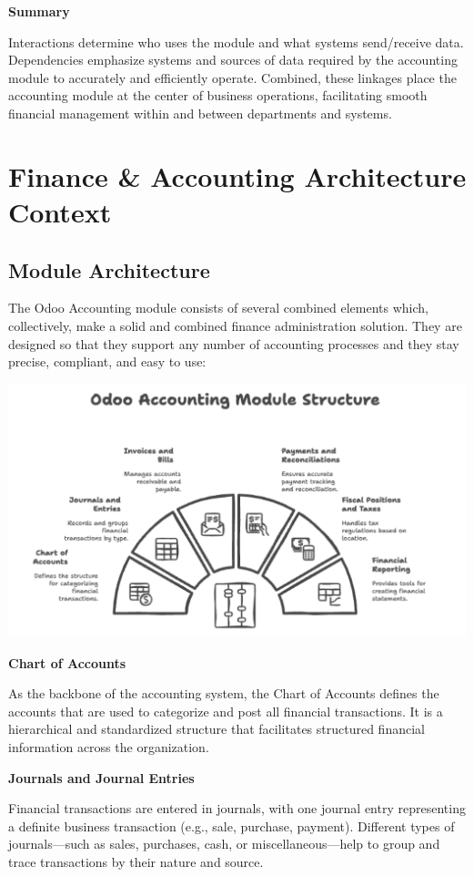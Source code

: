 \documentclass[11pt,a4paper]{article}
\begin{document}
\noindent\textbf{Summary}

\noindent Interactions determine who uses the module and what systems send/receive data. Dependencies emphasize systems and sources of data required by the accounting module to accurately and efficiently operate. Combined, these linkages place the accounting module at the center of business operations, facilitating smooth financial management within and between departments and systems.

\newpage
\section{Finance \& Accounting Architecture Context}
\subsection{Module Architecture}
The Odoo Accounting module consists of several combined elements which, collectively, make a solid and combined finance administration solution. They are designed so that they support any number of accounting processes and they stay precise, compliant, and easy to use:

\begin{center}
    \includegraphics[width=0.8\linewidth]{diagram/odoo_accounting_module_structure.png}
\end{center}

\noindent\textbf{Chart of Accounts}

\noindent As the backbone of the accounting system, the Chart of Accounts defines the accounts that are used to categorize and post all financial transactions. It is a hierarchical and standardized structure that facilitates structured financial information across the organization.
\medskip

\noindent\textbf{Journals and Journal Entries}

\noindent Financial transactions are entered in journals, with one journal entry representing a definite business transaction (e.g., sale, purchase, payment). Different types of journals—such as sales, purchases, cash, or miscellaneous—help to group and trace transactions by their nature and source.
\medskip
\end{document}
